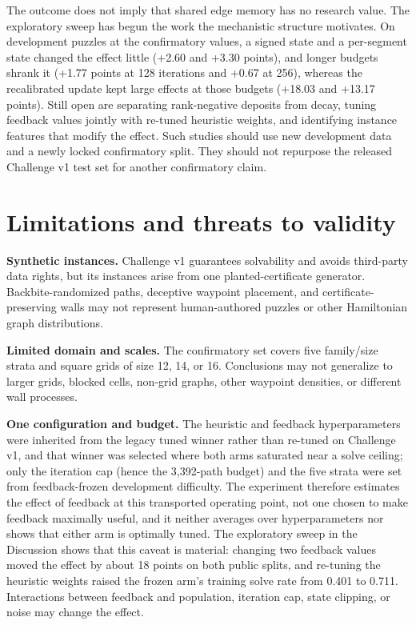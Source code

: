 \documentclass[pdflatex,sn-basic,iicol]{sn-jnl}
\begin{document}
The outcome does not imply that shared edge memory has no research value. The exploratory sweep has begun the work the mechanistic structure motivates. On development puzzles at the confirmatory values, a signed state and a per-segment state changed the effect little (+2.60 and +3.30 points), and longer budgets shrank it (+1.77 points at 128 iterations and +0.67 at 256), whereas the recalibrated update kept large effects at those budgets (+18.03 and +13.17 points). Still open are separating rank-negative deposits from decay, tuning feedback values jointly with re-tuned heuristic weights, and identifying instance features that modify the effect. Such studies should use new development data and a newly locked confirmatory split. They should not repurpose the released Challenge v1 test set for another confirmatory claim.

\section{Limitations and threats to validity}

\textbf{Synthetic instances.} Challenge v1 guarantees solvability and avoids third-party data rights, but its instances arise from one planted-certificate generator. Backbite-randomized paths, deceptive waypoint placement, and certificate-preserving walls may not represent human-authored puzzles or other Hamiltonian graph distributions.

\textbf{Limited domain and scales.} The confirmatory set covers five family/size strata and square grids of size 12, 14, or 16. Conclusions may not generalize to larger grids, blocked cells, non-grid graphs, other waypoint densities, or different wall processes.

\textbf{One configuration and budget.} The heuristic and feedback hyperparameters were inherited from the legacy tuned winner rather than re-tuned on Challenge v1, and that winner was selected where both arms saturated near a solve ceiling; only the iteration cap (hence the 3,392-path budget) and the five strata were set from feedback-frozen development difficulty. The experiment therefore estimates the effect of feedback at this transported operating point, not one chosen to make feedback maximally useful, and it neither averages over hyperparameters nor shows that either arm is optimally tuned. The exploratory sweep in the Discussion shows that this caveat is material: changing two feedback values moved the effect by about 18 points on both public splits, and re-tuning the heuristic weights raised the frozen arm's training solve rate from 0.401 to 0.711. Interactions between feedback and population, iteration cap, state clipping, or noise may change the effect.
\end{document}
